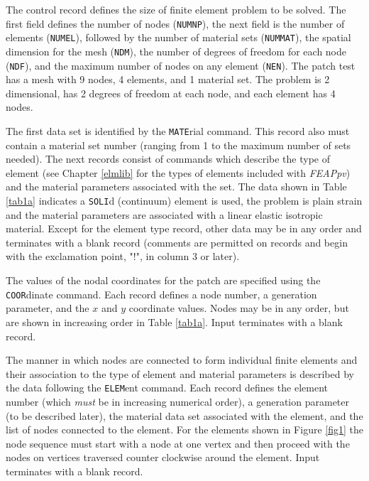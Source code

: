 The control record defines the size of finite element problem to be solved.
The first field defines the number of nodes ({\tt NUMNP}), the next field is the
number of elements ({\tt NUMEL}), followed by
the number of material sets ({\tt NUMMAT}),
the spatial dimension for the mesh ({\tt NDM}), the number of degrees of
freedom for each node ({\tt NDF}), and the maximum number of nodes on
any element ({\tt NEN}).  The patch test has a mesh with 9 nodes, 4 elements,
and 1 material set.  The problem is 2 dimensional, has 2 degrees of freedom
at each node, and each element has 4 nodes.

The first data set is identified by the {\tt MATE}rial command.  This record
also must contain a material set number (ranging from 1 to the maximum
number of sets needed).  The next records consist of commands which describe
the type of element (see Chapter \ref{elmlib}
for the types of elements included with
{\sl FEAPpv}) and the material parameters associated with the set.  The
data shown in Table \ref{tab1a}
indicates a {\tt SOLI}d (continuum) element is used,
the problem is plain strain and the material parameters are associated
with a linear elastic isotropic material.
Except for the element type record, other data may be in any order
and terminates with a blank record (comments are permitted on
records and begin with the exclamation point, "!", in column 3 or later).

The values of the nodal coordinates for the patch are specified using the 
{\tt COOR}dinate command.  Each record defines a node number, a generation
parameter, and the $x$ and $y$ coordinate
values.  Nodes may be in any order, but are shown in increasing order
in Table \ref{tab1a}.  Input terminates with a blank record.

The manner in which nodes are connected to form individual
finite elements and their association to the type of element and material
parameters is described by the data following the {\tt ELEM}ent command.
Each record defines the element number (which {\it must} be in increasing
numerical order), a generation parameter (to be described later), the
material data set associated with the element, and the list of nodes connected
to the element.  For the elements shown in Figure \ref{fig1} the node sequence
must start with a node at one vertex and then proceed with the nodes
on vertices traversed counter clockwise around the element.
Input terminates with a blank record.

